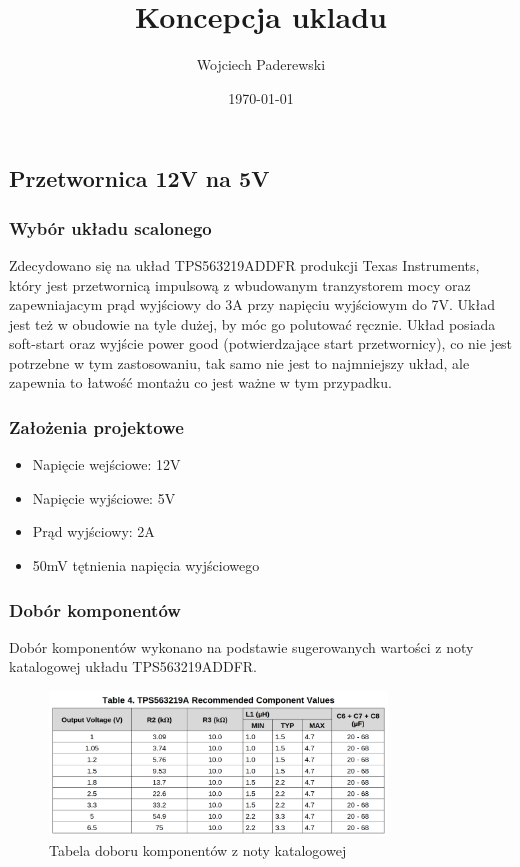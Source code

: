 \documentclass[../../main.tex]{subfiles}
\author{Wojciech Paderewski}
\date{\today}
\title{Koncepcja ukladu}
\begin{document}
\subsection{Przetwornica 12V na 5V}
\subsubsection{Wybór układu scalonego}

Zdecydowano się na układ TPS563219ADDFR produkcji Texas Instruments, który jest przetwornicą impulsową z wbudowanym tranzystorem mocy oraz zapewniajacym prąd wyjściowy do 3A przy 
napięciu wyjściowym do 7V. Układ jest też w obudowie na tyle dużej, by móc go polutować ręcznie. Układ posiada soft-start oraz wyjście power good (potwierdzające start przetwornicy), co nie jest potrzebne w tym zastosowaniu, tak samo 
nie jest to najmniejszy układ, ale zapewnia to łatwość montażu co jest ważne w tym przypadku.

\subsubsection{Założenia projektowe}
\begin{itemize}
    \item Napięcie wejściowe: 12V
    \item Napięcie wyjściowe: 5V
    \item Prąd wyjściowy: 2A
    \item 50mV tętnienia napięcia wyjściowego
\end{itemize}

\subsubsection{Dobór komponentów}
Dobór komponentów wykonano na podstawie sugerowanych wartości z noty katalogowej układu TPS563219ADDFR.

\begin{figure}[H]
    \centering
    \includegraphics[width=0.8\textwidth]{conv-table.png}
    \caption{Tabela doboru komponentów z noty katalogowej}
\end{figure}
\end{document}
